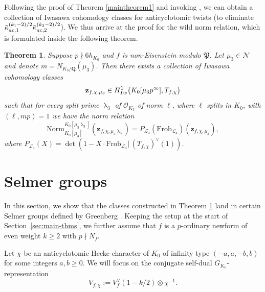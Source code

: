 \documentclass[10pt,letterpaper]{amsart}
\theoremstyle{plain}
\newtheorem{thm}{Theorem}[subsection] %
\theoremstyle{definition}
\theoremstyle{definition}
\theoremstyle{plain}
\theoremstyle{plain}
\theoremstyle{plain}
\theoremstyle{remark}
\numberwithin{equation}{section}
\DeclareMathOperator{\la}{\lambda}
\def\cL{{\mathcal L}}
\def\cO{\mathcal O}
\newcommand{\Q}{\mathbf{Q}}
\newcommand{\Z}{\mathbf{Z}}
\begin{document}
Following the proof of Theorem \ref{maintheorem1} and invoking \cite[Thm 6.4.1]{Rubin-ES}, we can obtain a collection of Iwasawa cohomology classes for anticyclotomic twists (to eliminate $\tilde{\kappa}_{\rm ac,1}^{(k_1-2)/2}\tilde{\kappa}_{\rm ac,2}^{(k_2-2)/2}$). We thus arrive at the proof for the wild norm relation, which is formulated inside the following theorem.

\begin{thm}\label{maintheorem2}
Suppose $p\nmid 6h_{K_0}$ and $f$ is non-Eisenstein modulo $\mathfrak{P}$. Let $\mu_3\in \mathcal{N}$ and denote $m=N_{K_3/\Q}(\mu_3)$. Then there exists a collection of Iwasawa cohomology classes
\[
\mathbf{z}_{f,\chi,\mu_3}\in H^1_{\rm Iw}\bigl(K_0[\mu_3 p^\infty],T_{f,\chi}\bigr)
\]
such that for every split prime $\la_3$ of $\cO_{K_3}$ of norm $\ell$, where $\ell$ splits in $K_0$, with $(\ell,mp)=1$ we have the norm relation
\begin{equation*}
    \mathrm{Norm}_{K_0[\mu_3]}^{K_0[\mu_3\la_3]}(\mathbf{z}_{f,\chi,\mu_3\la_3})=P_{\cL_4}(\mathrm{Frob}_{\cL_4})(\mathbf{z}_{f,\chi,\mu_3}),
\end{equation*}
where $P_{\cL_4}(X)=\det(1-X\cdot \mathrm{Frob}_{\cL_4}|\,(T_{f,\chi})^\vee(1))$.
\end{thm}




\section{Selmer groups }

In this section, we show that the classes constructed in Theorem \ref{maintheorem2} land in certain Selmer groups defined by Greenberg \cite{Greenberg55}. Keeping the setup at the start of Section~\ref{sec:main-thms}, we further assume that $f$ is a $p$-ordinary newform of even weight $k\geq 2$ with $p\nmid N_f$. 




Let $\chi$ be an anticyclotomic Hecke character of $K_0$ of infinity type $(-a,a,-b,b)$ for some integers $a,b\geq 0$. We will focus on the conjugate self-dual $G_{K_0}$-representation 
\[
V_{f,\chi}:=V_f^\vee(1-k/2)\otimes\chi^{-1}.
\]

\end{document}
